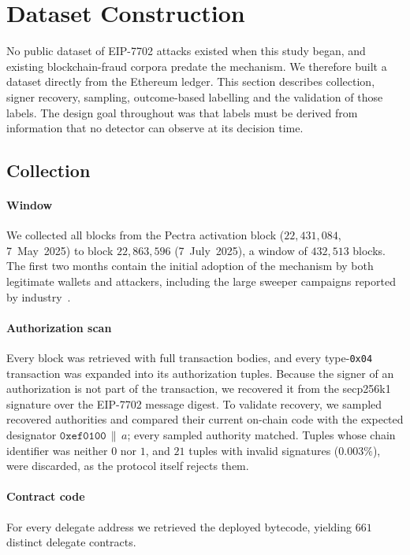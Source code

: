 \section{Dataset Construction}
\label{sec:data}

No public dataset of EIP-7702 attacks existed when this study began, and existing blockchain-fraud corpora predate the mechanism. We therefore built a dataset directly from the Ethereum ledger. This section describes collection, signer recovery, sampling, outcome-based labelling and the validation of those labels. The design goal throughout was that labels must be derived from information that no detector can observe at its decision time.

\subsection{Collection}
\paragraph{Window} We collected all blocks from the Pectra activation block ($22{,}431{,}084$, 7~May~2025) to block $22{,}863{,}596$ (7~July~2025), a window of $432{,}513$ blocks. The first two months contain the initial adoption of the mechanism by both legitimate wallets and attackers, including the large sweeper campaigns reported by industry~\cite{wintermute2025}.

\paragraph{Authorization scan} Every block was retrieved with full transaction bodies, and every type-\texttt{0x04} transaction was expanded into its authorization tuples. Because the signer of an authorization is not part of the transaction, we recovered it from the secp256k1 signature over the EIP-7702 message digest. To validate recovery, we sampled recovered authorities and compared their current on-chain code with the expected designator $\mathtt{0xef0100}\,\|\,a$; every sampled authority matched. Tuples whose chain identifier was neither $0$ nor $1$, and $21$ tuples with invalid signatures ($0.003\%$), were discarded, as the protocol itself rejects them.

\paragraph{Contract code} For every delegate address we retrieved the deployed bytecode, yielding $661$ distinct delegate contracts.

